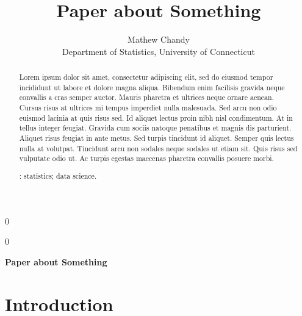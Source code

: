 \documentclass[12pt, letterpaper]{article}
\newcommand{\blind}{0}
\begin{document}

\blind
{
  \title{\bf Paper about Something}
  \author{Mathew Chandy\\[1ex]
  Department of Statistics, University of Connecticut\\
}
\date{}
  \maketitle
} \fi

\blind
{
  \bigskip
  \bigskip
  \bigskip
  \begin{center}
    {\LARGE\bf Paper about Something}
\end{center}
  \bigskip
} \fi


\doublespace

\begin{abstract}
Lorem ipsum dolor sit amet, consectetur adipiscing elit, sed do eiusmod tempor 
incididunt ut labore et dolore magna aliqua. Bibendum enim facilisis gravida 
neque convallis a cras semper auctor. Mauris pharetra et ultrices neque ornare 
aenean. Cursus risus at ultrices mi tempus imperdiet nulla malesuada. Sed arcu 
non odio euismod lacinia at quis risus sed. Id aliquet lectus proin nibh nisl 
condimentum. At in tellus integer feugiat. Gravida cum sociis natoque penatibus 
et magnis dis parturient. Aliquet risus feugiat in ante metus. Sed turpis 
tincidunt id aliquet. Semper quis lectus nulla at volutpat. Tincidunt arcu non 
sodales neque sodales ut etiam sit. Quis risus sed vulputate odio ut. Ac turpis 
egestas maecenas pharetra convallis posuere morbi.

\bigskip
{}:
statistics;
data science.
\end{abstract}


\section{Introduction}
\label{sec:intro}
\end{document}
